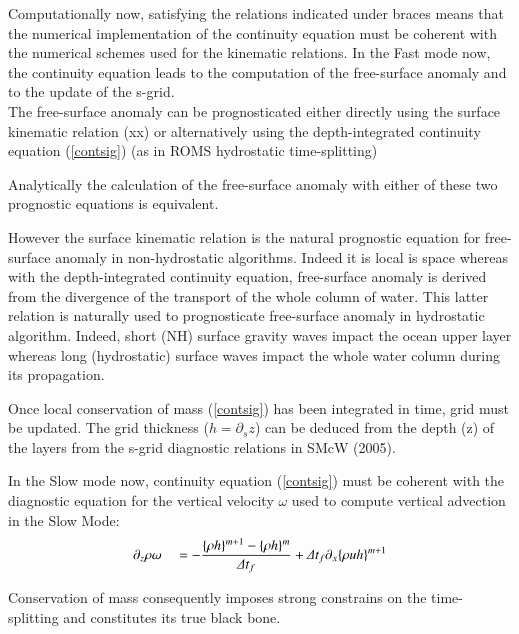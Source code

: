 \documentclass[a4paper,11pt]{article}
\begin{document}
  Computationally now, satisfying the relations indicated under braces means that the numerical implementation of the continuity equation must be coherent with the numerical schemes used for the kinematic relations. In the Fast mode now, the continuity equation leads to the computation of the free-surface anomaly and to the update of the s-grid.\\
  
  The free-surface anomaly can be prognosticated either directly using the surface kinematic relation (xx) or alternatively using the depth-integrated continuity equation (\ref{contsig}) (as in ROMS hydrostatic time-splitting)
  
  Analytically the calculation of the free-surface anomaly with either of these two prognostic equations is equivalent.
  
  However the surface kinematic relation is the natural prognostic equation for free-surface anomaly in non-hydrostatic algorithms. Indeed it is local is space whereas with the depth-integrated continuity equation, free-surface anomaly is derived from the divergence of the transport of the whole column of water. This latter relation is naturally used to prognosticate free-surface anomaly in hydrostatic algorithm. Indeed, short (NH) surface gravity waves impact the ocean upper layer whereas long (hydrostatic) surface waves impact the whole water column during its propagation.
  
  Once local conservation of mass (\ref{contsig}) has been integrated in time, grid must be updated. The grid thickness ($h=\partial_s z$) can be deduced from the depth (z) of the layers from the s-grid diagnostic relations in SMcW (2005).
  
  In the Slow mode now, continuity equation (\ref{contsig}) must be coherent with the diagnostic equation for the vertical velocity $\omega$ used to compute vertical advection in the Slow Mode:
  \begin{equation}
  \label{contsigomega}
   \begin{split}
    \displaystyle   
    & \partial_z \rho\omega &&= -\frac{\{\rho h\}^{m+1} - \{\rho h\}^m}{\Delta t_f} 
    + \Delta t_f \partial_x \{\rho uh\}^{m+1} \\
   \end{split}
  \end{equation}
  
  Conservation of mass consequently imposes strong constrains on the time-splitting and constitutes its true black bone. 
  
\end{document}
